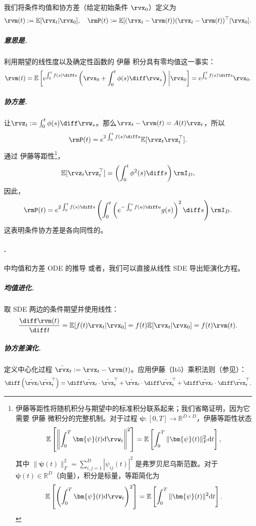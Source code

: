 我们将条件均值和协方差（给定初始条件 $\rvx_0$）定义为
\[
\rvm(t) := \mathbb{E}[\rvx_t | \rvx_0], \quad \rmP(t) := \mathbb{E}[(\rvx_t - \rvm(t))(\rvx_t - \rvm(t))^\top|\rvx_0].
\]

\subparagraph{意思是.}
利用期望的线性度以及确定性函数的 伊藤 积分具有零均值这一事实：
\begin{align*}
    \rvm(t) = \mathbb{E}\left[ e^{\int_0^t f(s) \diff s} \left( \rvx_0 + \int_0^t \phi(s) \diff \rvw_s \right) \bigg| \rvx_0 \right] = e^{\int_0^t f(s) \diff s} \rvx_0.
\end{align*}

\subparagraph{协方差.}
让$\rvz_t := \int_0^t \phi(s) \diff \rvw_s$。那么$\rvx_t - \rvm(t) = A(t) \rvz_t$，所以
\[
\rmP(t) = e^{2\int_0^t f(s) \diff s} \mathbb{E}[\rvz_t \rvz_t^\top].
\]
通过 伊藤等距性\footnote{伊藤等距性将随机积分与期望中的标准积分联系起来；我们省略证明，因为它需要 伊藤 微积分的完整机制。对于过程 $\bm{\psi} : [0,T] \to \mathbb{R}^{D \times D}$，伊藤等距性状态
\[
\mathbb{E}\left[\left\| \int_0^T \bm{\psi}(t)   \mathrm{d}\rvw_t \right\|^2 \right]
= \mathbb{E}\left[\int_0^T \|\bm{\psi}(t)\|_F^2   \mathrm{d}t \right],
\]
其中 $\|\bm{\psi}(t)\|_F^2 = \sum_{i,j=1}^D |\psi_{ij}(t)|^2$ 是弗罗贝尼乌斯范数。对于 $\bm{\psi}(t) \in \mathbb{R}^D$（向量），积分是标量，等距简化为
\[
\mathbb{E}\left[\left(\int_0^T \bm{\psi}(t)   \mathrm{d}\rvw_t\right)^2\right] = \mathbb{E}\left[\int_0^T \|\bm{\psi}(t)\|^2   \mathrm{d}t \right].
\]
}，
\[
\mathbb{E}[\rvz_t \rvz_t^\top] = \left( \int_0^t \phi^2(s) \diff s \right) \rmI_D,
\]
因此，
\[
\rmP(t) = e^{2\int_0^t f(s) \diff s} \left( \int_0^t \left( e^{-\int_0^s f(u) \diff u} g(s) \right)^2 \diff s \right) \rmI_D.
\]
这表明条件协方差是各向同性的。

\paragraph{.} 中均值和方差 ODE 的推导
或者，我们可以直接从线性 SDE  导出矩演化方程。


\subparagraph{均值进化.}
取 SDE 两边的条件期望并使用线性：
\[
\frac{\diff \rvm(t)}{\diff t} = \mathbb{E}[f(t) \rvx_t|\rvx_0] = f(t) \mathbb{E}[\rvx_t|\rvx_0] = f(t) \rvm(t).
\]

\vspace{0.3cm}

\subparagraph{协方差演化.}
定义中心化过程 $ \tilde{\rvx}_t := \rvx_t - \rvm(t) $。应用伊藤（It\^o）乘积法则（参见）：
\[
\diff \left( \tilde{\rvx}_t \tilde{\rvx}_t^\top \right)
= \diff \tilde{\rvx}_t \cdot \tilde{\rvx}_t^\top
+ \tilde{\rvx}_t \cdot \diff \tilde{\rvx}_t^\top
+ \diff \tilde{\rvx}_t \cdot \diff \tilde{\rvx}_t^\top.
\]

